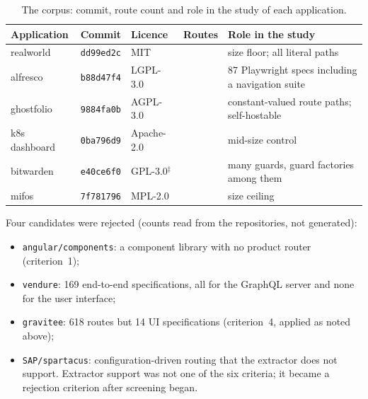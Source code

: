 \begin{table}[t]\small
\caption{The corpus: commit, route count and role in the study of each application.}
\label{tab:corpus}
\setlength{\tabcolsep}{4pt}
\begin{tabularx}{\textwidth}{@{}lllrY@{}}
\toprule
Application & Commit & Licence & Routes & Role in the study \\
\midrule
realworld & \texttt{dd99ed2c} & MIT & \RoundTwoRoutesRealworld{} & size floor; all literal paths \\
alfresco & \texttt{b88d47f4} & LGPL-3.0 & \RoundTwoRoutesAlfresco{} & 87 Playwright specs including a navigation suite \\
ghostfolio & \texttt{9884fa0b} & AGPL-3.0 & \RoundTwoRoutesGhostfolio{} & constant-valued route paths; self-hostable \\
k8s dashboard & \texttt{0ba796d9} & Apache-2.0 & \RoundTwoRoutesKdash{} & mid-size control \\
bitwarden & \texttt{e40ce6f0} & GPL-3.0$^{\ddagger}$ & \RoundTwoRoutesBitwarden{} & many guards, guard factories among them \\
mifos & \texttt{7f781796} & MPL-2.0 & \RoundTwoRoutesMifos{} & size ceiling \\
\bottomrule
\end{tabularx}
\par{}
\end{table}


Four candidates were rejected (counts read from the repositories, not generated):
\begin{itemize}
\item \texttt{angular/components}: a component library with no product router (criterion~1);
\item \texttt{vendure}: 169 end-to-end specifications, all for the GraphQL server and none for the
user interface;
\item \texttt{gravitee}: 618 routes but 14 UI specifications (criterion~4, applied as noted above);
\item \texttt{SAP/spartacus}: configuration-driven routing that the extractor does not support. Extractor
support was not one of the six criteria; it became a rejection criterion after screening began.
\end{itemize}

